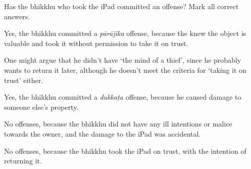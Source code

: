 \begin{exam}{\autoExamName}
\begin{problem}
  Has the bhikkhu who took the iPad committed an offense? Mark all correct answers.

\end{problem}

\begin{manswers}{1}
    \bChoices

     Yes, the bhikkhu committed a \emph{pārājika} offense, because the knew the object is valuable and took it without permission to take it on trust. \eAns

    \begin{solution}
      One might argue that he didn't have `the mind of a thief', since he probably wants to return it later,
      although he doesn't meet the criteria for `taking it on trust' either.
    \end{solution}

     Yes, the bhikkhu committed a \emph{dukkaṭa} offense, because he caused damage to someone else's property. \eAns

     No offenses, because the bhikkhu did not have any ill intentions or malice towards the owner, and the damage to the iPad was accidental. \eAns

     No offenses, because the bhikkhu took the iPad on trust, with the intention of returning it. \eAns

    \eChoices
\end{manswers}

\end{exam}

